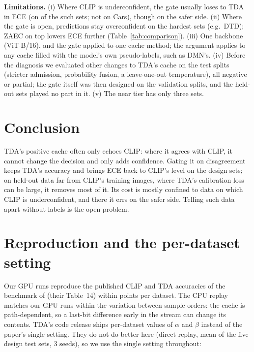 \documentclass[10pt]{article}
\begin{document}
\textbf{Limitations.} (i) Where CLIP is underconfident, the gate usually loses to TDA in ECE (on \gapLoseUnderN{} of the \gapUnderN{} such
sets; not on Cars), though on the safer side. (ii) Where
the gate is open, predictions stay overconfident on the hardest sets (e.g.\ DTD); ZAEC on top lowers ECE further
(Table~\ref{tab:comparison}). (iii) One backbone (ViT-B/16), and the gate applied to one cache method; the argument
applies to any cache filled with the model's own pseudo-labels, such as DMN's. (iv) Before the diagnosis we evaluated
other changes to TDA's cache on the test splits (stricter admission, probability fusion, a leave-one-out temperature),
all negative or partial; the gate itself was then designed on the validation splits, and the held-out sets played no
part in it. (v) The near tier has only three sets.

\section{Conclusion}
TDA's positive cache often only echoes CLIP: where it agrees with CLIP, it cannot change the decision and only adds
confidence. Gating it on disagreement keeps TDA's accuracy and brings ECE back to CLIP's level on the design sets; on
held-out data far from CLIP's training images, where TDA's calibration loss can be large, it removes most of it. Its cost
is mostly confined to data on which CLIP is underconfident, and there it errs on the safer side. Telling such data apart
without labels is the open problem.




\appendix
\section{Reproduction and the per-dataset setting}\label{app:p1}
Our GPU runs reproduce the published CLIP and TDA accuracies of the benchmark of \citet{sheng2025illusion} (their
Table~14) within \reproMaxDelta{} points per dataset. The CPU replay matches our GPU runs within the variation between
sample orders: the cache is path-dependent, so a last-bit difference early in the stream can change its contents. TDA's
code release ships per-dataset values of $\alpha$ and $\beta$ instead of the paper's single setting. They do not do
better here (direct replay, mean of the five design test sets, 3 seeds), so we use the single setting throughout:

\begin{center}\small\end{center}
\end{document}
